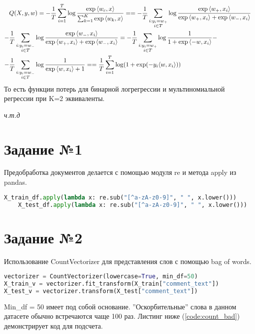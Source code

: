 \documentclass[12pt,fleqn]{article}
\begin{document}
\begin{align}
    \notag & Q(X,y,w) = -\frac{1}{T}\sum_{i=1}^{T}\log
    \frac{\exp{\langle w_c,x \rangle}}{\sum_{k=1}^{K}\exp{\langle w_k,x \rangle}}=
     = - \frac{1}{T}\sum_{\substack{i:y_i=w_{+} \\ i\in T}}
    \log\frac{\exp{\langle w_{+}, x_i \rangle}}{\exp{\langle w_{+}, x_i \rangle}+\exp{\langle w_{-}, x_i \rangle}}\\
    \notag - &\frac{1}{T}\sum_{\substack{i:y_i=w_{-} \\ i\in T}}
    \log\frac{\exp{\langle w_{-}, x_i \rangle}}{\exp{\langle w_{+}, x_i \rangle}+\exp{\langle w_{-}, x_i \rangle}} = 
     - \frac{1}{T}\sum_{\substack{i:y_i=w_{+} \\ i\in T}}\log\frac{1}{1+\exp{\langle -w, x_i \rangle}}- \\
    \notag- &\frac{1}{T}\sum_{\substack{i:y_i=w_{-} \\ i\in T}}\log\frac{1}{\exp{\langle w, x_i \rangle} + 1} = 
    = \frac{1}{T}\sum_{i=1}^{T}\log(1+\exp(-y_i\langle w,x_i \rangle))
\end{align}
То есть функции потерь для бинарной логрегрессии и мультиномиальной регрессии 
при K=2 эквиваленты.

\noindent\textit{ч.т.д}
\section{Задание №1}
\noindent Предобработка документов делается с помощью модуля re и метода apply из pandas.
\begin{lstlisting}[language=Python, caption=Clear documents]
    X_train_df.apply(lambda x: re.sub("[^a-zA-z0-9]", " ", x.lower()))
    X_test_df.apply(lambda x: re.sub("[^a-zA-z0-9]", " ", x.lower()))
\end{lstlisting}
\section{Задание №2}
\noindent Использование CountVectorizer для представления слов с помощью bag of words.

\begin{lstlisting}[language=Python, caption=Vectorizer]
vectorizer = CountVectorizer(lowercase=True, min_df=50)
X_train_v = vectorizer.fit_transform(X_train["comment_text"])
X_test_v = vectorizer.transform(X_test["comment_text"])
\end{lstlisting}

\noindent Min\_df = 50 имеет под собой основание. ''Оскорбительные'' слова в данном датасете обычно
встречаются чаще 100 раз. Листинг ниже (\ref{code:count_bad}) демонстрирует код для подсчета.
\end{document}
